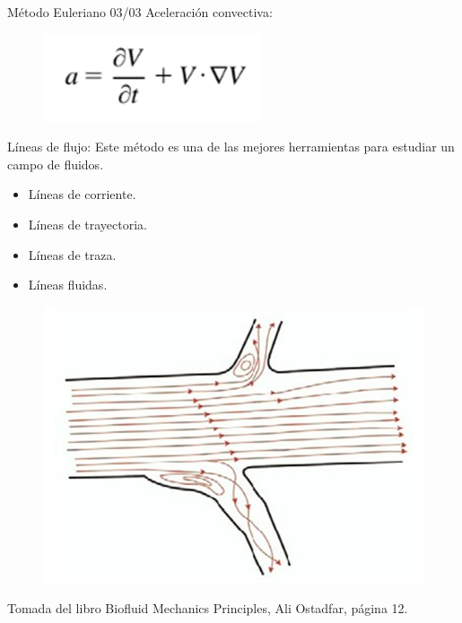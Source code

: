 \begin{frame}{Método Euleriano 03/03}
\justifying
Aceleración convectiva:
\begin{figure}[H]
\centering
\includegraphics[scale=0.4]{Section_Files/picmanuel/06.png}
\label{fig: Figura2-Fig0403-03}
\end{figure}
Líneas de flujo: Este método es una de las mejores herramientas para estudiar un campo de fluidos.
\begin{itemize}
\item Líneas de corriente.
\item Líneas de trayectoria.
\item Líneas de traza.
\item Líneas fluidas.
\end{itemize}
\begin{figure}[H]
\centering
\includegraphics[scale=0.2]{Section_Files/picmanuel/07.png}
\label{fig: Figura2-Fig0403-04}
\end{figure}
{\tiny Tomada del libro Biofluid Mechanics Principles, Ali Ostadfar, página 12.}
\end{frame}	

